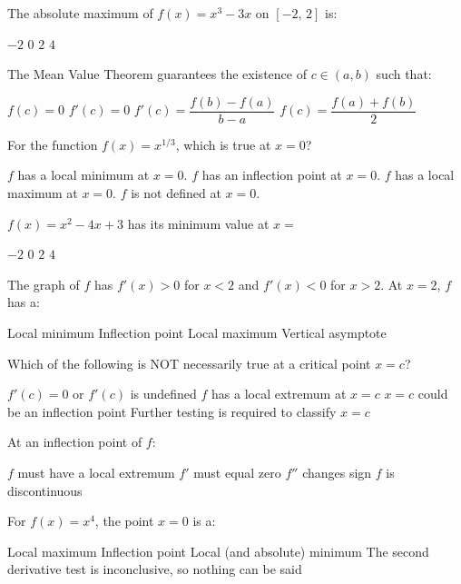 \documentclass[addpoints]{exam}
\begin{document}
\begin{questions}
\question[1] The absolute maximum of $f(x) = x^3 - 3x$ on $[-2,\, 2]$ is:
\begin{choices}
    \choice $-2$
    \choice $0$
    \correctchoice $2$
    \choice $4$
\end{choices}

\question[1] The Mean Value Theorem guarantees the existence of $c \in (a, b)$ such that:
\begin{choices}
    \choice $f(c) = 0$
    \choice $f'(c) = 0$
    \correctchoice $f'(c) = \dfrac{f(b) - f(a)}{b - a}$
    \choice $f(c) = \dfrac{f(a) + f(b)}{2}$
\end{choices}

\question[1] For the function $f(x) = x^{1/3}$, which is true at $x = 0$?
\begin{choices}
    \choice $f$ has a local minimum at $x = 0$.
    \correctchoice $f$ has an inflection point at $x = 0$.
    \choice $f$ has a local maximum at $x = 0$.
    \choice $f$ is not defined at $x = 0$.
\end{choices}

\question[1] $f(x) = x^2 - 4x + 3$ has its minimum value at $x = $
\begin{choices}
    \choice $-2$
    \choice $0$
    \correctchoice $2$
    \choice $4$
\end{choices}

\question[1] The graph of $f$ has $f'(x) > 0$ for $x < 2$ and $f'(x) < 0$ for $x > 2$.
At $x = 2$, $f$ has a:
\begin{choices}
    \choice Local minimum
    \choice Inflection point
    \correctchoice Local maximum
    \choice Vertical asymptote
\end{choices}

\question[1] Which of the following is NOT necessarily true at a critical point $x = c$?
\begin{choices}
    \choice $f'(c) = 0$ or $f'(c)$ is undefined
    \correctchoice $f$ has a local extremum at $x = c$
    \choice $x = c$ could be an inflection point
    \choice Further testing is required to classify $x = c$
\end{choices}

\question[1] At an inflection point of $f$:
\begin{choices}
    \choice $f$ must have a local extremum
    \choice $f'$ must equal zero
    \correctchoice $f''$ changes sign
    \choice $f$ is discontinuous
\end{choices}

\question[1] For $f(x) = x^4$, the point $x = 0$ is a:
\begin{choices}
    \choice Local maximum
    \choice Inflection point
    \correctchoice Local (and absolute) minimum
    \choice The second derivative test is inconclusive, so nothing can be said
\end{choices}



\end{questions}
\end{document}
